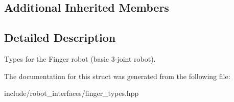 \subsection*{Additional Inherited Members}


\subsection{Detailed Description}
Types for the Finger robot (basic 3-\/joint robot). 

The documentation for this struct was generated from the following file\+:\begin{DoxyCompactItemize}
\item 
include/robot\+\_\+interfaces/finger\+\_\+types.\+hpp\end{DoxyCompactItemize}
